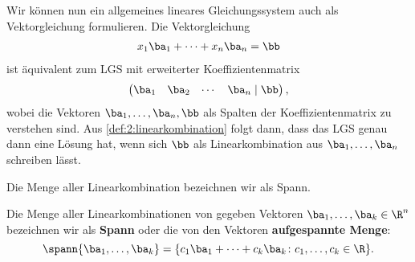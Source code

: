 





Wir können nun ein allgemeines lineares Gleichungssystem auch als Vektorgleichung formulieren.
Die Vektorgleichung
\begin{align*}
	x_1 \ba_1 + \cdots + x_n \ba_n = \bb
\end{align*}
ist äquivalent zum LGS mit erweiterter Koeffizientenmatrix
$$ \begin{pmatrix}
		\ba_1 & \ba_2 & \cdots & \ba_n \mid \bb
	\end{pmatrix},$$
wobei die Vektoren $\ba_1, \dots, \ba_n, \bb$ als Spalten der Koeffizientenmatrix zu verstehen sind. Aus \cref{def:2:linearkombination} folgt dann, dass das LGS  genau dann eine Lösung hat, wenn sich $\bb$ als Linearkombination aus $\ba_1, \dots, \ba_n$ schreiben lässt.


Die Menge aller Linearkombination bezeichnen wir als Spann.

\begin{definition} \label{def:2:spann}
	Die Menge aller Linearkombinationen von gegeben Vektoren $\ba_1, \dots, \ba_k \in \R^n$ bezeichnen wir als \textbf{Spann} oder die von den Vektoren \textbf{aufgespannte Menge}:
	$$\spann\{\ba_1, \dots, \ba_k\} = \{ c_1 \ba_1 + \cdots + c_k \ba_k\colon c_1, \dots, c_k \in \R\}.$$
\end{definition}

